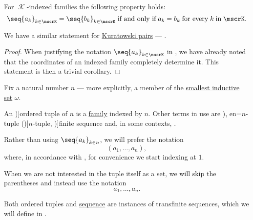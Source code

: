 \begin{proposition}\label{thm:indexed_family_extensionality}
  For \( \mscrK \)-\hyperref[def:indexed_family]{indexed families} the following property holds:
  \begin{equation}\label{eq:thm:indexed_family_extensionality}
    \seq{ a_k }_{k \in \mscrK} = \seq{ b_k }_{k \in \mscrK} \T{if and only if} a_k = b_k \T{for every} k \T{in} \mscrK.
  \end{equation}
\end{proposition}
\begin{comments}
  \item We have a similar statement for \hyperref[def:kuratowski_pair]{Kuratowski pairs} --- .
\end{comments}
\begin{proof}
  When justifying the notation \( \seq{ a_k }_{k \in \mscrK} \) in , we have already noted that the coordinates of an indexed family completely determine it. This statement is then a trivial corollary.
\end{proof}

\begin{definition}\label{def:ordered_tuple}
  Fix a natural number \( n \) --- more explicitly, a member of the \hyperref[thm:smallest_inductive_set_existence]{smallest inductive set} \( \omega \).

  An \term[ru=кортеж (\cite[def. 1.2]{БелоусовТкачёв2004ДискретнаяМатематика})]{ordered tuple} of  \( n \) is a \hyperref[def:indexed_family]{family} indexed by \( n \). Other terms in use are \term[ru=упорядоченная \( n \)-ка (\cite[9]{Архангельский1988КанторовскаяТеорияМножеств}), en=\( n \)-tuple (\cite[51]{Enderton1977SetTheory})]{\( n \)-tuple}, \term[en=finite sequence (\cite[9]{Halmos1960NaiveSetTheory})]{finite sequence} and, in some contexts, .

  Rather than using \( \seq{ a_k }_{k \in n} \), we will prefer the notation
  \begin{equation*}
    (a_1, \ldots, a_n),
  \end{equation*}
  where, in accordance with , for convenience we start indexing at \( 1 \).

  When we are not interested in the tuple itself as a set, we will skip the parentheses and instead use the notation
  \begin{equation*}
    a_1, \ldots, a_n.
  \end{equation*}
\end{definition}
\begin{comments}
  \item Both ordered tuples and \hyperref[def:sequence]{sequence} are instances of transfinite sequences, which we will define in .
\end{comments}

